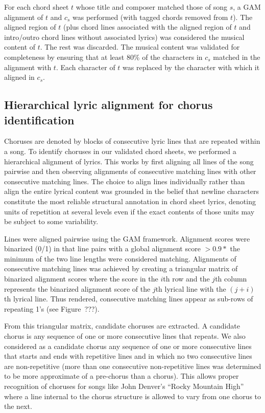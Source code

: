 \documentclass[12pt]{article}
\begin{document}
For each chord sheet $t$ whose title and composer matched those of song $s$, a GAM alignment of $t$ and $c_s$ was performed (with tagged chords removed from $t$). The aligned region of $t$ (plus chord lines associated with the aligned region of $t$ and intro/outro chord lines without associated lyrics) was considered the musical content of $t$. The rest was discarded. The musical content was validated for completeness by ensuring that at least 80\% of the characters in $c_s$ matched in the alignment with $t$. Each character of $t$ was replaced by the character with which it aligned in $c_s$.

\subsection{Hierarchical lyric alignment for chorus identification}

Choruses are denoted by blocks of consecutive lyric lines that are repeated within a song. To identify choruses in our validated chord sheets, we performed a hierarchical alignment of lyrics. This works by first aligning all lines of the song pairwise and then observing alignments of consecutive matching lines with other consecutive matching lines. The choice to align lines individually rather than align the entire lyrical content was grounded in the belief that newline characters constitute the most reliable structural annotation in chord sheet lyrics, denoting units of repetition at several levels even if the exact contents of those units may be subject to some variability. 

Lines were aligned pairwise using the GAM framework. Alignment scores were binarized (0/1) in that line pairs with a global alignment score $> 0.9*$ the minimum of the two line lengths were considered matching. Alignments of consecutive matching lines was achieved by creating a triangular matrix of binarized alignment scores where the score in the $i$th row and the $j$th column represents the binarized alignment score of the $j$th lyrical line with the $(j+i)$th lyrical line. Thus rendered, consecutive matching lines appear as sub-rows of repeating 1's (see Figure~???).

From this triangular matrix, candidate choruses are extracted. A candidate chorus is any sequence of one or more consecutive lines that repeats. We also considered as a candidate chorus any sequence of one or more consecutive lines that starts and ends with repetitive lines and in which no two consecutive lines are non-repetitive (more than one consecutive non-repetitive lines was determined to be more approximate of a pre-chorus than a chorus). This allows proper recognition of choruses for songs like John Denver's ``Rocky Mountain High'' where a line internal to the chorus structure is allowed to vary from one chorus to the next.
\end{document}
